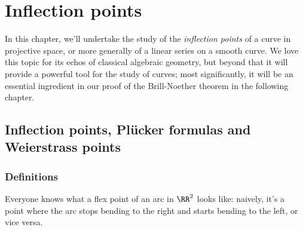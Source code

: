 

\chapter{Inflection points}\label{inflections chapter}
\label{InflectionsChapter}




In this chapter, we'll undertake the study of the \emph{inflection points} of a curve in projective space, or more generally of a linear series on a smooth curve. We love this topic for its echos of classical algebraic geometry, but beyond that it will provide a powerful tool for the study of curves; most significantly, it will be an essential ingredient in our proof of the Brill-Noether theorem in the following chapter. 



\section{Inflection points,  Pl\"ucker formulas and Weierstrass points}

\subsection{Definitions}

Everyone knows what a flex point of an arc in $\RR^2$ looks like: naively, it's a point where the arc stops bending to the right and starts bending to the left, or vice versa. 

